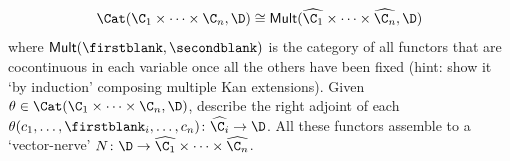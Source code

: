 \begin{exerciseset}
\begin{exercisepoints}
\[
\Cat(\C_1 \times \dots \times \C_n , \D) \cong 
\textsf{Mult}(\widehat{\C_1}\times \dots \times \widehat{\C_n}, \D)
\]
where $\textsf{Mult}(\firstblank,\secondblank)$ is the category of all functors that are cocontinuous in each variable once all the others have been fixed (hint: show it `by induction' composing multiple Kan extensions). Given $\theta \in \Cat(\C_1 \times \dots \times \C_n , \D)$, describe the right adjoint of each $\theta(c_1,\dots,\firstblank_i,\dots, c_n)\colon \widehat{\C_i} \to \D$. All these functors assemble to a `vector-nerve' $N\colon \D \to \widehat{\C_1}\times \dots \times \widehat{\C_n}$.
\end{exercisepoints}
\end{exerciseset}

